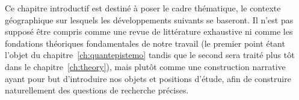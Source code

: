 Ce chapitre introductif est destiné à poser le cadre thématique, le contexte géographique sur lesquels les développements suivants se baseront. Il n'est pas supposé être compris comme une revue de littérature exhaustive ni comme les fondations théoriques fondamentales de notre travail (le premier point étant l'objet du chapitre~\ref{ch:quantepistemo} tandis que le second sera traité plus tôt dans le chapitre~\ref{ch:theory}), mais plutôt comme une construction narrative ayant pour but d'introduire nos objets et positions d'étude, afin de construire naturellement des questions de recherche précises.



